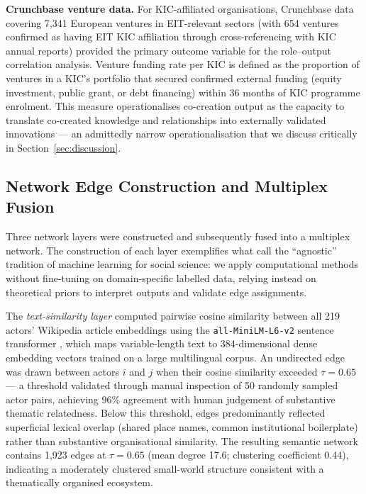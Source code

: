 \documentclass[review,12pt]{elsarticle}
\begin{document}
\textbf{Crunchbase venture data.} For KIC-affiliated organisations, Crunchbase data covering 7{,}341 European ventures in EIT-relevant sectors (with 654 ventures confirmed as having EIT KIC affiliation through cross-referencing with KIC annual reports) provided the primary outcome variable for the role--output correlation analysis. Venture funding rate per KIC is defined as the proportion of ventures in a KIC's portfolio that secured confirmed external funding (equity investment, public grant, or debt financing) within 36 months of KIC programme enrolment. This measure operationalises co-creation output as the capacity to translate co-created knowledge and relationships into externally validated innovations --- an admittedly narrow operationalisation that we discuss critically in Section~\ref{sec:discussion}.

\subsection{Network Edge Construction and Multiplex Fusion}

Three network layers were constructed and subsequently fused into a multiplex network. The construction of each layer exemplifies what \citet{grimmer2021machine} call the ``agnostic'' tradition of machine learning for social science: we apply computational methods without fine-tuning on domain-specific labelled data, relying instead on theoretical priors to interpret outputs and validate edge assignments.

The \emph{text-similarity layer} computed pairwise cosine similarity between all 219 actors' Wikipedia article embeddings using the \texttt{all-MiniLM-L6-v2} sentence transformer \citep{reimers2019sentence}, which maps variable-length text to 384-dimensional dense embedding vectors trained on a large multilingual corpus. An undirected edge was drawn between actors $i$ and $j$ when their cosine similarity exceeded $\tau = 0.65$ --- a threshold validated through manual inspection of 50 randomly sampled actor pairs, achieving 96\% agreement with human judgement of substantive thematic relatedness. Below this threshold, edges predominantly reflected superficial lexical overlap (shared place names, common institutional boilerplate) rather than substantive organisational similarity. The resulting semantic network contains 1{,}923 edges at $\tau = 0.65$ (mean degree 17.6; clustering coefficient 0.44), indicating a moderately clustered small-world structure \citep{watts1998collective} consistent with a thematically organised ecosystem.
\end{document}
